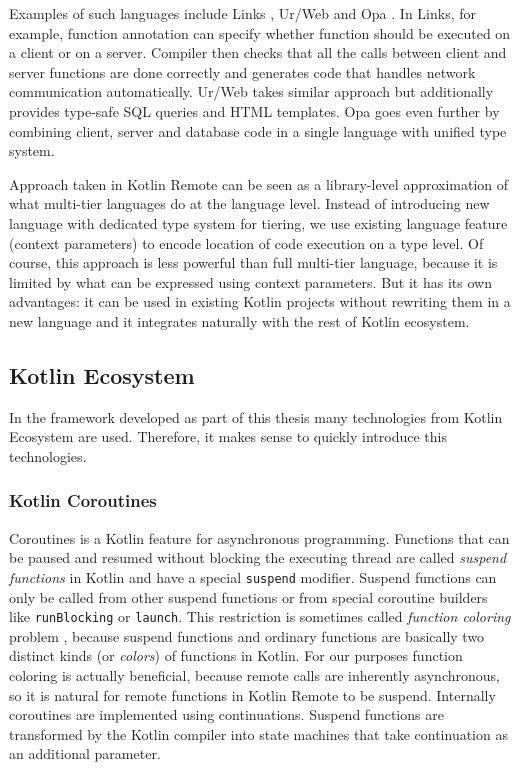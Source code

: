 \documentclass[a4paper,11pt,oneside]{article}
\newcommand{\term}[1]{\textit{#1}}
\newcommand{\kotlini}[1]{\texttt{#1}}
\begin{document}
Examples of such languages include Links \cite{cooper_links_2007}, Ur/Web
\cite{chlipala_urweb_2015} and Opa \cite{noauthor_opa_nodate}. In Links, for example, function
annotation can specify whether function should be executed on a client or on a server. Compiler
then checks that all the calls between client and server functions are done correctly and
generates code that handles network communication automatically. Ur/Web takes similar approach but
additionally provides type-safe SQL queries and HTML templates. Opa goes even further by combining
client, server and database code in a single language with unified type system.

Approach taken in Kotlin Remote can be seen as a library-level approximation of what multi-tier
languages do at the language level. Instead of introducing new language with dedicated type system
for tiering, we use existing language feature (context parameters) to encode location of code
execution on a type level. Of course, this approach is less powerful than full multi-tier language,
because it is limited by what can be expressed using context parameters. But it has its own
advantages: it can be used in existing Kotlin projects without rewriting them in a new language
and it integrates naturally with the rest of Kotlin ecosystem.

\subsection{Kotlin Ecosystem}
In the framework developed as part of this thesis many technologies from Kotlin Ecosystem are used.
Therefore, it makes sense to quickly introduce this technologies.

\subsubsection{Kotlin Coroutines}

Coroutines \cite{noauthor_kotlin_coroutines_nodate} is a Kotlin feature for asynchronous
programming. Functions that can be paused and resumed without blocking the executing thread are
called \term{suspend functions} in Kotlin and have a special \kotlini{suspend} modifier. Suspend
functions can only be called from other suspend functions or from special coroutine builders like
\kotlini{runBlocking} or \kotlini{launch}. This restriction is sometimes called \term{function
coloring} problem \cite{noauthor_what_nodate}\cite{noauthor_keepnotescode-coloringmd_nodate},
because suspend functions and ordinary functions are basically two distinct kinds (or
\term{colors}) of functions in Kotlin. For our purposes function coloring is actually beneficial,
because remote calls are inherently asynchronous, so it is natural for remote functions in Kotlin
Remote to be suspend. Internally coroutines are implemented using continuations. Suspend functions are transformed by the
Kotlin compiler into state machines that take continuation as an additional parameter.
\end{document}
